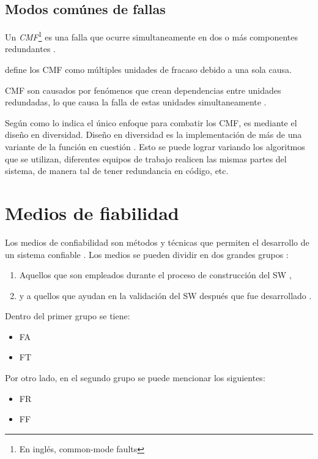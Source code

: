 \subsection{Modos comúnes de fallas}
Un \textit{\ac{CMF}}\footnote{En inglés, common-mode faults} es una falla que ocurre 
simultaneamente en dos o más componentes redundantes \citep{FTDesign}. 

\cite{Gangloff75} define los \ac{CMF} como múltiples unidades de fracaso debido a una sola causa. 

\ac{CMF} son causados por fenómenos que crean dependencias entre unidades redundadas, lo que causa 
la falla de estas unidades simultaneamente \citep{FTDesign}. 

Según como lo indica \cite{FTDesign} el único enfoque para combatir los \ac{CMF}, es mediante el 
diseño en diversidad. Diseño en diversidad es la implementación de más de una variante de la 
función en cuestión \citep{FTDesign}. Esto se puede lograr variando los algoritmos que se utilizan, 
diferentes equipos de trabajo realicen las mismas partes del sistema, de manera tal de tener 
redundancia en código, etc. 

\section{Medios de fiabilidad}
Los medios de confiabilidad son métodos y técnicas que permiten el desarrollo de un sistema 
confiable \citep{FTDesign}. Los medios se pueden dividir en dos grandes grupos \citep{Pullum01}:
\begin{enumerate}
 \item Aquellos que son empleados durante el proceso de construcción del \ac{SW} \citep{Pullum01},
 \item y a quellos que ayudan en la validación del \ac{SW} después que fue desarrollado 
\citep{Pullum01}.
\end{enumerate}

Dentro del primer grupo se tiene:
\begin{itemize}
 \item \acl{FA}
 \item \acl{FT}
\end{itemize}

Por otro lado, en el segundo grupo se puede mencionar los siguientes:
\begin{itemize}
 \item \acl{FR}
 \item \acl{FF}
\end{itemize}


